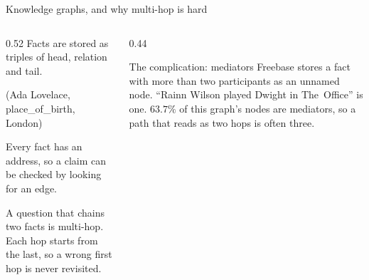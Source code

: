 \begin{frame}{Knowledge graphs, and why multi-hop is hard}
  \begin{columns}[T]
    \begin{column}{0.52\textwidth}
      \agrraggedright
      Facts are stored as \alert{triples} of head, relation and tail.
      \smallskip

      \hspace{3mm}\textsf{(Ada Lovelace, place\_of\_birth, London)}
      \smallskip

      Every fact has an address, so a claim can be checked by looking for
      an edge.
      \smallskip

      A question that chains two facts is \alert{multi-hop}. Each hop
      starts from the last, so a wrong first hop is never revisited.
    \end{column}
    \begin{column}{0.44\textwidth}
      \begin{block}{The complication: mediators}
        \agrraggedright
        Freebase stores a fact with more than two participants as an
        unnamed \alert{node}. ``Rainn Wilson played Dwight in
        \mbox{\textsf{The Office}}'' is one. $63.7\%$ of this graph's nodes
        are mediators, so a path that reads as two hops is often three.
      \end{block}
    \end{column}
  \end{columns}
\end{frame}

